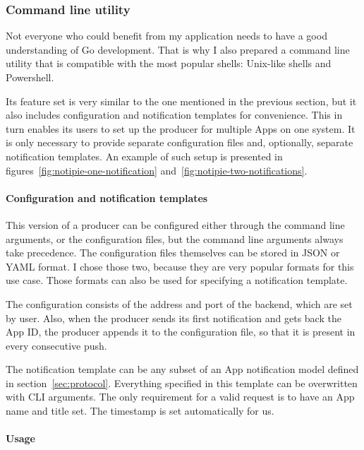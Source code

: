 \subsubsection{Command line utility}\label{sec:command-line-utility}

Not everyone who could benefit
from my application
needs to have a good understanding
of Go development.
That is why I also prepared
a command line utility
that is compatible with the most popular shells:
Unix-like shells and Powershell.

Its feature set is very similar
to the one mentioned in the previous section,
but it also includes configuration
and notification templates
for convenience.
This in turn enables its users
to set up the producer for multiple Apps
on one system.
It is only necessary to provide
separate configuration files
and, optionally, separate notification templates.
An example of such setup is presented
in figures~\ref{fig:notipie-one-notification}
and~\ref{fig:notipie-two-notifications}.

\paragraph*{Configuration and notification templates}\label{sec:configuration-and-notification-templates}

This version of a producer can be configured
either through the command line arguments,
or the configuration files,
but the command line arguments
always take precedence.
The configuration files themselves
can be stored in \ac{JSON} or \ac{YAML} format.
I chose those two,
because they are very popular formats
for this use case.
Those formats can also be used
for specifying a notification template.

The configuration consists of
the address and port of the backend,
which are set by user.
Also, when the producer sends its first notification
and gets back the App \ac{ID},
the producer appends it to the configuration file,
so that it is present in every consecutive push.

The notification template can be any
subset of an App notification model
defined in section~\ref{sec:protocol}.
Everything specified in this template
can be overwritten with \ac{CLI} arguments.
The only requirement for a valid request
is to have an App name and title set.
The timestamp is set automatically for us.

\paragraph*{Usage}\label{sec:producer-usage}

